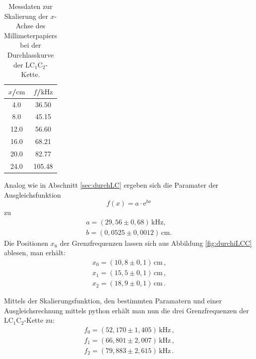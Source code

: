 \begin{table}
	\caption{Messdaten zur Skalierung der $x$-Achse des Millimeterpapiers bei der
	Durchlasskurve der LC$_1$C$_2$-Kette.}
	\label{tab:skalaLCC}
	\centering
	\begin{tabular}{cc}
		\toprule
		$x$/$\si{\centi\meter}$ & $f$/$\si{\kilo\hertz}$ \\
		\midrule
		4.0                     & 36.50                  \\
		8.0                     & 45.15                  \\
		12.0                    & 56.60                  \\
		16.0                    & 68.21                  \\
		20.0                    & 82.77                  \\
		24.0                    & 105.48                 \\
		\bottomrule
	\end{tabular}
\end{table}
Analog wie in Abschnitt \ref{sec:durchLC} ergeben sich die Paramater der Ausgleichsfunktion
\begin{equation*}
	f(x) = a \cdot \mathrm{e}^{bx}
\end{equation*}
zu
\begin{gather*}
	a = (29,56 \pm 0,68) \, \si{\kilo\hertz} \text{,} \\
	b = (0,0525 \pm 0,0012) \, \si{\centi\meter} \text{.}
\end{gather*}
Die Positionen $x_\text{n}$ der Grenzfrequenzen lassen sich aus Abbildung \ref{fig:durchiLCC}
ablesen, man erhält:
\begin{gather*}
	x_0 = (10,8 \pm 0,1) \, \si{\centi\meter} \, \text{,} \\
	x_1 = (15,5 \pm 0,1) \, \si{\centi\meter} \, \text{,} \\
	x_2 = (18,9 \pm 0,1) \, \si{\centi\meter} \, \text{.}
\end{gather*}

Mittels der Skalierungsfunktion, den bestimmten Paramatern und einer Ausgleichsrechnung mittels python erhält man nun die drei Grenzfrequenzen der
LC$_1$C$_2$-Kette zu:
\begin{gather*}
	f_0 = (52,170 \pm 1,405) \, \si{\kilo\hertz} \, \text{,} \\
	f_1 = (66,801 \pm 2,007) \, \si{\kilo\hertz} \, \text{,} \\
	f_2 = (79,883 \pm 2,615) \, \si{\kilo\hertz} \, \text{.}
\end{gather*}

